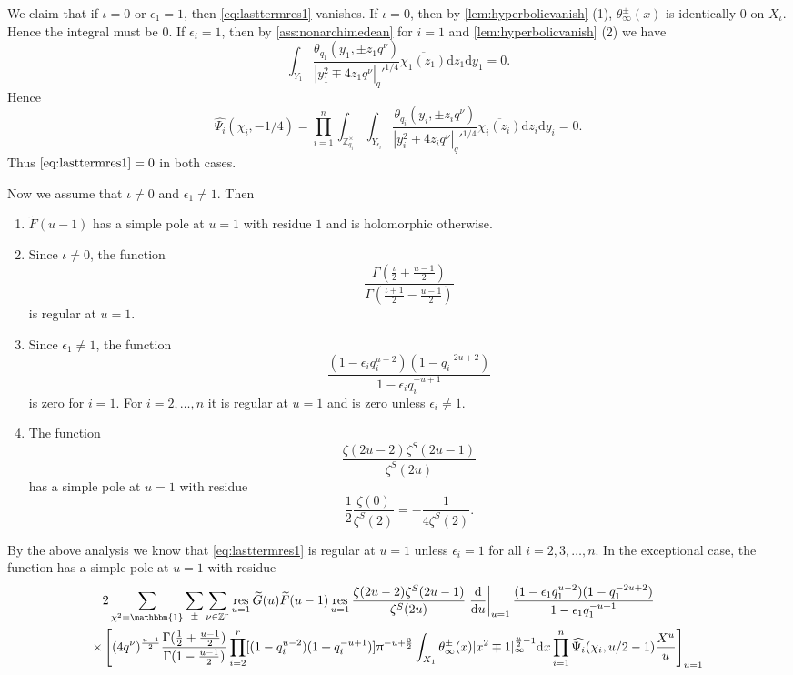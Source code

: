 \documentclass[10pt,oneside,reqno]{amsart}
\makeatletter
\newcommand\rmd{\mathrm{d}}
\newcommand\ZZ{\mathbb{Z}}
\newcommand\triv{\mathbbm{1}}
\DeclareMathOperator\res{res}
\theoremstyle{THEOREM}
\theoremstyle{DEFINITION}
\theoremstyle{EXERCISE}
\numberwithin{equation}{section}
\renewenvironment{proof}[1][\proofname]{\par
  \vspace{-6pt}
  \pushQED{\qed}
  \normalfont \topsep6\p@\@plus6\p@\relax
  \trivlist
  \item[\hskip\labelsep\rmfamily\bfseries
    #1\@addpunct{:}]\ignorespaces
}{
  \popQED\endtrivlist\@endpefalse
  \vspace{-6pt}
}
\makeatother
\begin{document}
\begin{proof}
We claim that if $\iota=0$ or $\epsilon_1=1$, then \eqref{eq:lasttermres1} vanishes. If $\iota=0$, then by \autoref{lem:hyperbolicvanish} (1), $\theta_\infty^\pm(x)$ is identically $0$ on $X_\iota$.
Hence the integral must be $0$. If $\epsilon_i=1$, then by \autoref{ass:nonarchimedean} for $i=1$ and \autoref{lem:hyperbolicvanish} (2) we have
\[
\int_{Y_1} \frac{\theta_{q_1}(y_1,\pm z_1q^\nu)}{|y_1^2\mp 4z_1q^\nu|_q'^{1/4}}\overline{\chi_1(z_1)}\rmd z_1\rmd y_1=0.
\]
Hence
\[
\widehat{\Psi_i}(\chi_i,-1/4)=\prod_{i=1}^{n}\int_{\ZZ_{q_i}^\times}\int_{Y_{\epsilon_i}} \frac{\theta_{q_i}(y_i,\pm z_iq^\nu)}{|y_i^2\mp 4z_iq^\nu|_q'^{1/4}}\overline{\chi_i(z_i)}\rmd z_i\rmd y_i=0.
\]
Thus $\eqref{eq:lasttermres1}=0$ in both cases.

Now we assume that $\iota\neq 0$ and $\epsilon_1\neq 1$. Then
\begin{enumerate}[itemsep=0pt,parsep=0pt,topsep=0pt,leftmargin=0pt,labelsep=2.5pt,itemindent=12pt,label=\textbullet]
  \item $\widetilde{F}(u-1)$ has a simple pole at $u=1$ with residue $1$ and is holomorphic otherwise.
  \item Since $\iota\neq 0$, the function 
  \[
  \frac{\Gamma(\frac{\iota}{2}+\frac{u-1}{2})}{\Gamma(\frac{\iota+1}{2}-\frac{u-1}{2})}
  \]
  is regular at $u=1$. 
  \item Since $\epsilon_1\neq 1$, the function 
  \[
  \frac{(1-\epsilon_i q_i^{u-2})(1-q_i^{-2u+2})}{1-\epsilon_iq_i^{-u+1}}
  \]
  is zero for $i=1$. For $i=2,\dots,n$ it is regular at $u=1$ and is zero unless $\epsilon_i\neq 1$.
  \item The function
  \[
  \frac{\zeta(2u-2)\zeta^S(2u-1)}{\zeta^S(2u)}
  \]
  has a simple pole at $u=1$ with residue
  \[
  \frac{1}{2}\frac{\zeta(0)}{\zeta^S(2)}=-\frac{1}{4\zeta^S(2)}.
  \]
\end{enumerate}
By the above analysis we know that  \eqref{eq:lasttermres1} is regular at $u=1$ unless $\epsilon_i=1$ for all $i=2,3,\dots,n$. In the exceptional case, the function has a simple pole at $u=1$ with residue
\begin{align*}
&2\sum_{\chi^2=\triv}\sum_{\pm}\sum_{\nu\in \ZZ^r}\res_{u=1}\widetilde{G}(u)\widetilde{F}(u-1)\res_{u=1}\frac{\zeta(2u-2)\zeta^S(2u-1)}
{\zeta^S(2u)} \left.\frac{\rmd}{\rmd u}\right|_{u=1}\frac{(1-\epsilon_1 q_1^{u-2})(1-q_1^{-2u+2})}{1-\epsilon_1q_1^{-u+1}}  \\
\times&\left[(4q^\nu)^{\frac{u-1}{2}} \frac{\Gamma(\frac{1}{2}+\frac{u-1}{2})}{\Gamma(1-\frac{u-1}{2})} \prod_{i=2}^{r}[(1-q_i^{u-2})(1+q_i^{-u+1})]\uppi^{-u+\frac32}\int_{X_1}\theta_\infty^\pm(x)|x^2\mp 1|_\infty^{\frac u2-1}\rmd x\prod_{i=1}^{n}\widehat{\Psi_i}(\chi_i,u/2-1)\frac{X^u}{u}\right]_{u=1}\\

\end{align*}
\end{proof}
\end{document}
